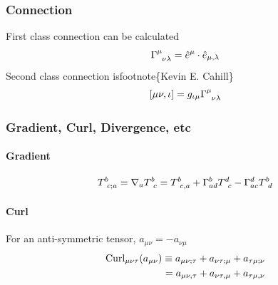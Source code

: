 \documentclass[letterpaper,10pt,english]{sphinxmanual}
\begin{document}
\subsubsection{Connection}
\label{math:connection}
First class connection can be calculated
\begin{gather}
\begin{split}\Gamma^\mu_{\phantom{\mu}\nu\lambda}=\hat e^\mu\cdot \hat e_{\mu,\lambda}\end{split}\notag
\end{gather}
Second class connection isfootnote\{Kevin E. Cahill\}
\begin{gather}
\begin{split}[\mu\nu,\iota]=g_{\iota\mu}\Gamma^\mu_{\phantom{\mu}\nu\lambda}\end{split}\notag
\end{gather}

\subsubsection{Gradient, Curl, Divergence, etc}
\label{math:gradient-curl-divergence-etc}

\paragraph{Gradient}
\label{math:gradient}\begin{gather}
\begin{split}T^b_{\phantom bc;a}= \nabla_aT^b_{\phantom bc}=T^b_{\phantom bc,a}+\Gamma^b_{ad}T^d_{\phantom dc}-\Gamma^d_{ac}T^b_{\phantom bd}\end{split}\notag
\end{gather}

\paragraph{Curl}
\label{math:curl}
For an anti-symmetric tensor, \(a_{\mu\nu}=-a_{\nu\mu}\)
\begin{gather}
\begin{split}\mathrm{Curl}_{\mu\nu\tau}(a_{\mu\nu})  \equiv  a_{\mu\nu;\tau}+a_{\nu\tau;\mu}+a_{\tau\mu;\nu} \\
 = a_{\mu\nu,\tau}+a_{\nu\tau,\mu}+a_{\tau\mu,\nu}\end{split}\notag
\end{gather}
\end{document}
